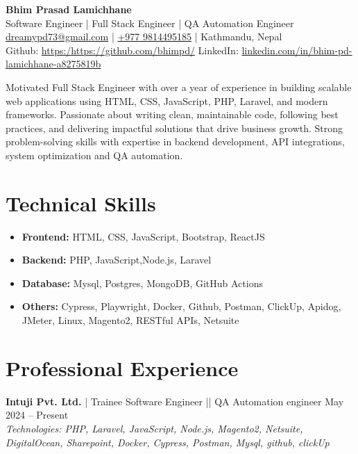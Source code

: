\documentclass[a4paper,10pt]{article}
\begin{document}
\begin{center}
    {\LARGE \textbf{Bhim Prasad Lamichhane}} \\[0.5em]
    \small {Software Engineer} | Full Stack Engineer | QA Automation Engineer \\[0.5em]
    \href{mailto:dreamypd73@gmail.com}{dreamypd73@gmail.com} |
    \href{tel:+9779814495185}{+977 9814495185} | Kathmandu, Nepal \\[0.5em]
 
    Github: \href{https://github.com/bhimpd/}{https:/https://github.com/bhimpd/}
    LinkedIn:     \href{https://www.linkedin.com/in/bhim-pd-lamichhane-a8275819b/}{linkedin.com/in/bhim-pd-lamichhane-a8275819b}

\end{center}


\noindent Motivated Full Stack Engineer with over a year of experience in building scalable web applications using HTML, CSS, JavaScript, PHP, Laravel, and modern frameworks. Passionate about writing clean, maintainable code, following best practices, and delivering impactful solutions that drive business growth. Strong problem-solving skills with expertise in backend development, API integrations, system optimization and QA automation.



\section*{Technical Skills}
\begin{itemize}
    \item \textbf{Frontend:} HTML, CSS, JavaScript, Bootstrap, ReactJS
    \item \textbf{Backend:} PHP, JavaScript,Node.js, Laravel
    \item \textbf{Database:} Mysql, Postgres, MongoDB, GitHub Actions
    \item \textbf{Others:} Cypress, Playwright, Docker, Github, Postman, ClickUp, Apidog, JMeter, Linux, Magento2, RESTful APIs, Netsuite
\end{itemize}

\section*{Professional Experience}
\textbf{Intuji Pvt. Ltd.} | Trainee Software Engineer || QA Automation engineer \hfill May 2024 -- Present \\
\textit{Technologies: PHP, Laravel, JavaScript, Node.js, Magento2, Netsuite, DigitalOcean, Sharepoint, Docker, Cypress, Postman, Mysql, github, clickUp}
\end{document}

